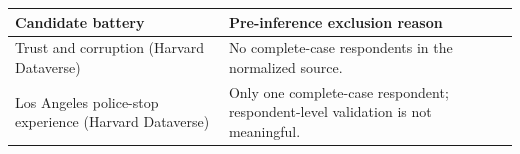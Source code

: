 \begin{tabular}{p{}p{}}\toprule
Candidate battery & Pre-inference exclusion reason \\
\midrule
Trust and corruption (Harvard Dataverse) & No complete-case respondents in the normalized source. \\
Los Angeles police-stop experience (Harvard Dataverse) & Only one complete-case respondent; respondent-level validation is not meaningful. \\
\bottomrule\end{tabular}
